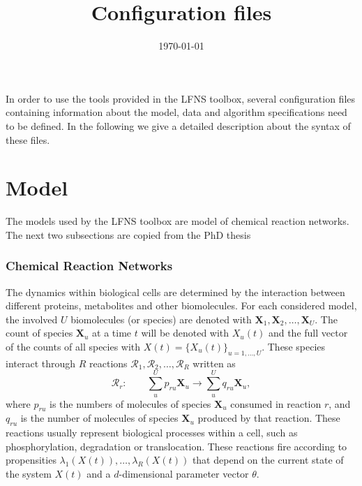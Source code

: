 \documentclass[11pt]{article} %
\title{Configuration files}
\date{\today} %
\begin{document}
\maketitle
In order to use the tools provided in the LFNS toolbox, several configuration files containing information about the model, data and algorithm specifications need to be defined. In the following we give a detailed description about the syntax of these files. 

\part{Model}
The models used by the LFNS toolbox are model of chemical reaction networks. The next two subsections are copied from the PhD thesis 


  \parbox{\textwidth}{
}


\section{Chemical Reaction Networks}
\label{sec:crn}
The dynamics within biological cells are determined by the interaction between different proteins, metabolites and other biomolecules. For each considered model, the involved $U$ biomolecules (or species) are denoted  with $\bm{X}_1, \bm{X}_2, \ldots, \bm{X}_U$. The count of species $\bm{X}_u$ at a time $t$ will be denoted with $X_u(t)$ and the full vector of the counts of all species with $X(t) = \{X_u(t)\}_{u = 1, \ldots, U}$. 
These species interact through $R$ reactions $\mathcal{R}_1, \mathcal{R}_2, \ldots, \mathcal{R}_R$ written as 
\begin{equation}
\mathcal{R}_r :\qquad \sum\limits_{u}^U p_{ru}\bm{X}_u \rightarrow \sum\limits_{u}^Uq_{ru} \bm{X}_u,
\label{eq:reactions}
\end{equation}
where $p_{ru}$ is the numbers of molecules of species $\bm{X}_u$  consumed in reaction $r$, and $q_{ru}$ is the number of molecules of species $\bm{X}_u$ produced by that reaction. These reactions usually represent biological processes within a cell, such as phosphorylation, degradation or translocation. These reactions fire according to propensities $\lambda_1\left(X(t)\right), \ldots, \lambda_R\left(X(t)\right)$ that depend on the current state of the system $X(t)$ and a $d$-dimensional parameter vector $\theta$. 
\end{document}
